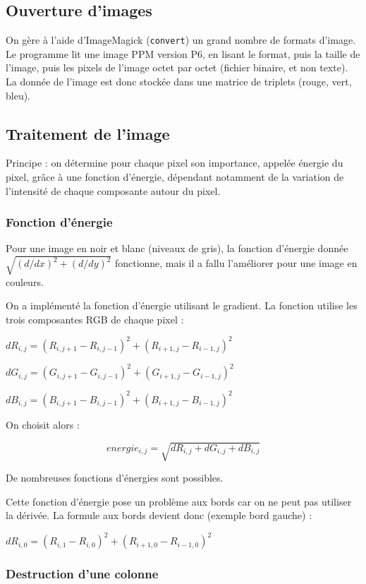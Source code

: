 \documentclass[a4paper]{article}
\begin{document}
\subsection{Ouverture d'images}

On gère à l'aide d'ImageMagick ({\tt convert}) un grand nombre de formats d'image. Le programme lit une image PPM version P6, en lisant le format, puis la taille de l'image, puis les pixels de l'image octet par octet (fichier binaire, et non texte). La donnée de l'image est donc stockée dans une matrice de triplets (rouge, vert, bleu).


\subsection{Traitement de l'image}

Principe : on détermine pour chaque pixel son importance, appelée énergie du pixel, grâce à une fonction d'énergie, dépendant notamment de la variation de l'intensité de chaque composante autour du pixel.

\subsubsection{Fonction d'énergie}

Pour une image en noir et blanc (niveaux de gris), la fonction d'énergie donnée $\sqrt{(d/dx)^2+(d/dy)^2}$ fonctionne, mais il a fallu l'améliorer pour une image en couleurs.

On a implémenté la fonction d'énergie utilisant le gradient. La fonction utilise les trois composantes RGB de chaque pixel :

$dR_{i,j} = (R_{i,j+1} - R_{i,j-1})^2 + (R_{i+1,j} - R_{i-1,j})^2$

$dG_{i,j} = (G_{i,j+1} - G_{i,j-1})^2 + (G_{i+1,j} - G_{i-1,j})^2$

$dB_{i,j} = (B_{i,j+1} - B_{i,j-1})^2 + (B_{i+1,j} - B_{i-1,j})^2$

On choisit alors :

\[energie_{i,j} = \sqrt{dR_{i,j} + dG_{i,j} + dB_{i,j}}\]

De nombreuses fonctions d'énergies sont possibles.

Cette fonction d'énergie pose un problème aux bords car on ne peut pas utiliser la dérivée. La formule aux bords devient donc (exemple bord gauche) :

$dR_{i,0} = (R_{i,1} - R_{i,0})^2 + (R_{i+1,0} - R_{i-1,0})^2$


\subsubsection{Destruction d'une colonne}
\end{document}
